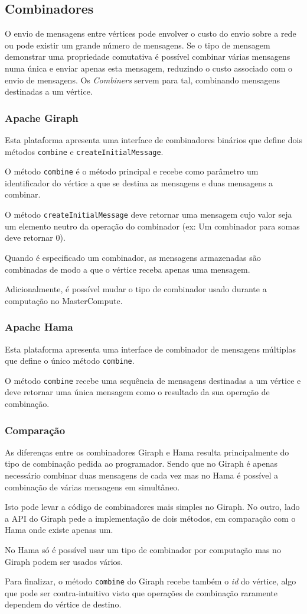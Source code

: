 \newpage
\subsection{Combinadores}
O envio de mensagens entre vértices pode envolver o custo do envio sobre a rede ou pode existir um grande número de mensagens. Se o tipo de mensagem demonstrar uma propriedade comutativa é possível combinar várias mensagens numa única e enviar apenas esta mensagem, reduzindo o custo associado com o envio de mensagens. Os \textit{Combiners} servem para tal, combinando mensagens destinadas a um vértice.

\subsubsection*{Apache Giraph}
Esta plataforma apresenta uma interface de combinadores binários que define dois métodos \texttt{combine} e \texttt{createInitialMessage}.

O método \texttt{combine} é o método principal e recebe como parâmetro um identificador do vértice a que se destina as mensagens e duas mensagens a combinar.

O método \texttt{createInitialMessage} deve retornar uma mensagem cujo valor seja um elemento neutro da operação do combinador (ex: Um combinador para somas deve retornar 0).

Quando é especificado um combinador, as mensagens armazenadas são combinadas de modo a que o vértice receba apenas uma mensagem.

Adicionalmente, é possível mudar o tipo de combinador usado durante a computação no MasterCompute.

\subsubsection*{Apache Hama}
Esta plataforma apresenta uma interface de combinador de mensagens múltiplas que define o único método \texttt{combine}.

O método \texttt{combine} recebe uma sequência de mensagens destinadas a um vértice e deve retornar uma única mensagem como o resultado da sua operação de combinação.


\subsubsection*{Comparação}
As diferenças entre os combinadores Giraph e Hama resulta principalmente do tipo de combinação pedida ao programador. Sendo que no Giraph é apenas necessário combinar duas mensagens de cada vez mas no Hama é possível a combinação de várias mensagens em simultâneo.

Isto pode levar a código de combinadores mais simples no Giraph. No outro, lado a API do Giraph pede a implementação de dois métodos, em comparação com o Hama onde existe apenas um.

No Hama só é possível usar um tipo de combinador por computação mas no Giraph podem ser usados vários.

Para finalizar, o método \texttt{combine} do Giraph recebe também o \textit{id} do vértice, algo que pode ser contra-intuitivo visto que operações de combinação raramente dependem do vértice de destino.
